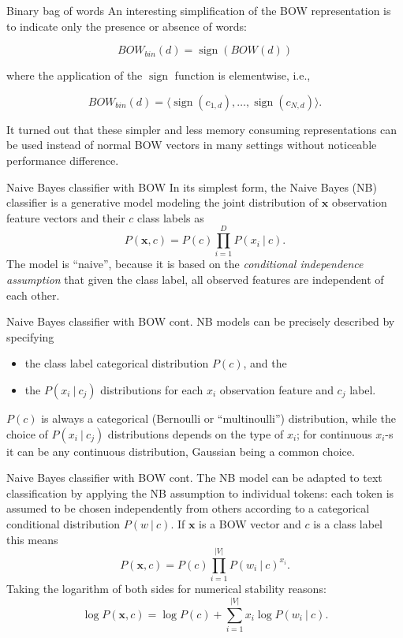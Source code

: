 \documentclass[style=upen, size=14pt]{powerdot}
\DeclareMathOperator{\sign}{sign}
\theoremstyle{definition}
\begin{document}
 \begin{slide}[toc=]{Binary bag of words}
   An interesting simplification of the BOW representation is to indicate only
   the presence or absence of words:

   $$BOW_{bin}(d)=\sign(BOW(d))$$

   where the application of the $\sign$ function is elementwise, i.e.,

   $$BOW_{bin}(d)=\langle \sign(c_{1,d}), \dots, \sign(c_{N,d})\rangle.$$
   
   It turned out that these simpler and less memory consuming representations
   can be used instead of normal BOW vectors in many settings without noticeable
   performance difference.
 \end{slide}

 \begin{slide}[toc=Naive Bayes]{Naive Bayes classifier with BOW}
   In its simplest form, the Naive Bayes (NB) classifier is a generative model
   modeling the joint distribution of $\mathbf{x}$ observation feature vectors
   and their $c$ class labels as
   $$
   P(\mathbf{x}, c) = P(c)\prod_{i=1}^D P(x_i~\vert~c).
   $$
   The model is ``naive'', because it is based on the \emph{conditional
     independence assumption} that given the class label, all observed features
   are independent of each other.
 \end{slide}

 \begin{slide}[toc=]{Naive Bayes classifier with BOW cont.}
   NB models can be precisely described by specifying
   \begin{itemize}
   \item the class label categorical distribution $P(c)$, and the
   \item the $P(x_i~\vert~ c_j)$ distributions for each $x_i$ observation
     feature and $c_j$ label.
   \end{itemize}
   $P(c)$ is always a categorical (Bernoulli or ``multinoulli'') distribution,
   while the choice of $P(x_i~\vert~ c_j)$ distributions depends on the type of
   $x_i$; for continuous $x_i$-s it can be any continuous distribution,
   Gaussian being a common choice.
 \end{slide}

 \begin{slide}[toc=]{Naive Bayes classifier with BOW cont.}
   The NB model can be adapted to text classification by applying the NB
   assumption to individual tokens: each token is assumed to be chosen
   independently from others according to a categorical conditional distribution
   $P(w ~|~ c)$. If $\mathbf{x}$ is a BOW vector and $c$ is a class label this
   means
   $$
   P(\mathbf{x}, c) = P(c) \prod_{i=1}^{|V|}P(w_i~\vert~c)^{x_i}.
   $$
   Taking the logarithm of both sides for numerical stability reasons:
   $$
   \log P(\mathbf{x}, c) = \log P(c) + \sum_{i=1}^{|V|}x_i \log P(w_i~\vert~c).
   $$
 \end{slide}
\end{document}
